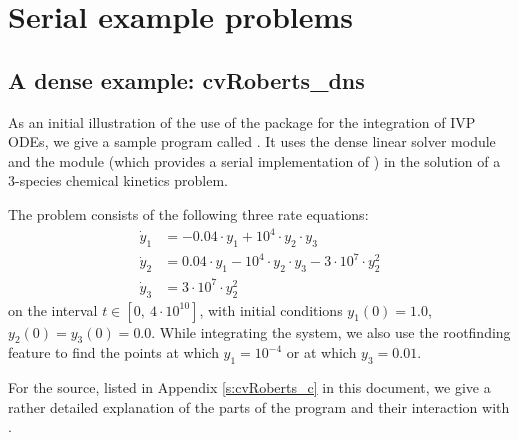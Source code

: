 \section{Serial example problems}\label{s:ex_serial}

\subsection{A dense example: cvRoberts\_dns}\label{ss:cvRoberts}

As an initial illustration of the use of the {\cvode} package for the
integration of IVP ODEs, we give a sample program called .
It uses the {\cvode} dense linear solver module {\cvdense} 
and the {\nvecs} module (which provides a serial implementation of {\nvector})
in the solution of a 3-species chemical kinetics problem.

The problem consists of the following three rate equations:
\vspace*{-.08in}
\begin{equation}
  \begin{split}
    \dot{y}_1 &= -0.04 \cdot y_1 + 10^4 \cdot y_2 \cdot y_3 \\
    \dot{y}_2 &=  0.04 \cdot y_1 - 10^4 \cdot y_2 \cdot y_3
                                  - 3 \cdot 10^7 \cdot y_2^2 \\
    \dot{y}_3 &=  3 \cdot 10^7 \cdot y_2^2
  \end{split} 
\end{equation}
on the interval $t \in [0, ~4 \cdot 10^{10}]$, with initial conditions
$y_1(0) = 1.0$, $y_2(0) = y_3(0) = 0.0$.
While integrating the system, we also use the rootfinding
feature to find the points at which $y_1 = 10^{-4}$ or at which
$y_3 = 0.01$.

For the source, listed in Appendix \ref{s:cvRoberts_c} in this document,
we give a rather detailed explanation of the parts of the program and
their interaction with {\cvode}.

